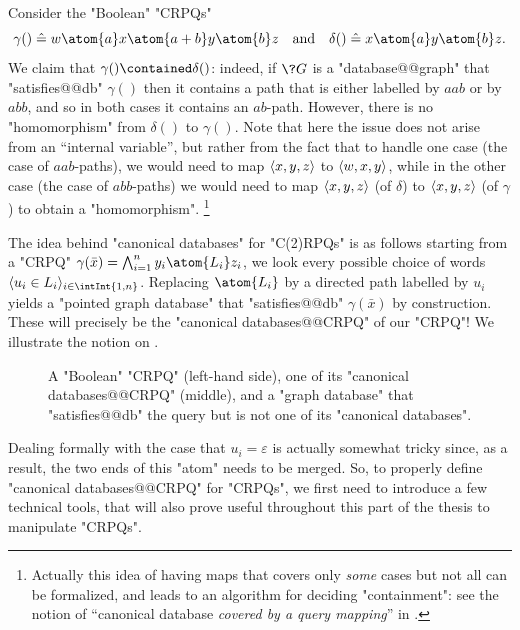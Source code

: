 \begin{example}
    \label{ex:ex-containment-non-uniform}
    Consider the "Boolean" "CRPQs"
    \[
        \gamma() \defeq w \atom{a} x \atom{a+b} y \atom{b} z
        \quad\text{and}\quad 
        \delta() \defeq x \atom{a} y \atom{b} z.
    \]
    We claim that $\gamma() \contained \delta()$: indeed, 
    if $\?G$ is a "database@@graph" that "satisfies@@db" $\gamma()$
    then it contains a path that is either labelled by
    $aab$ or by $abb$, and so in both cases it contains an $ab$-path.
    However, there is no "homomorphism" from $\delta()$ to $\gamma()$.
    Note that here the issue does not arise from an
    ``internal variable'', but rather from the fact that
    to handle one case (the case of $aab$-paths), we would need to
    map $\tup{x,y,z}$ to $\tup{w,x,y}$, while in the other case (the case of
    $abb$-paths) we would need to map $\tup{x,y,z}$ (of $\delta$)
    to $\tup{x,y,z}$ (of $\gamma$) to obtain a "homomorphism".%
    \footnote[][-10em]{Actually this idea of having maps that covers only \emph{some} cases
    but not all can be formalized, and leads to an algorithm
    for deciding "containment": see the notion of
    ``canonical database \emph{covered by a query mapping}'' in \cite{FlorescuLevySuciu1998Containment}.}
\end{example}

The idea behind "canonical databases" for "C(2)RPQs" is as follows
starting from a "CRPQ" $\gamma(\bar x) = \bigwedge_{i=1}^n y_i \atom{L_i} z_i$,
we look every possible choice of words $\tup{u_i \in L_i}_{i\in \intInt{1,n}}$.
Replacing $\atom{L_i}$ by a directed path labelled by $u_i$ yields a "pointed graph database"
that "satisfies@@db" $\gamma(\bar x)$ by construction. These will precisely be
the "canonical databases@@CRPQ" of our "CRPQ"! We illustrate the notion on
.
\begin{figure}
    \centering
    \begin{tikzpicture}
        
    \end{tikzpicture}
    \caption{\AP\label{fig:first-ex-cdb-wow-im-moved}
    A "Boolean" "CRPQ" (left-hand side), one of its "canonical databases@@CRPQ"
    (middle), and a "graph database" that "satisfies@@db" the query but is not one of its "canonical databases".
    }
\end{figure}
Dealing formally with the case that $u_i = \varepsilon$ is actually somewhat tricky
since, as a result, the two ends of this "atom" needs to be merged.
So, to properly define "canonical databases@@CRPQ" for "CRPQs",
we first need to introduce a few technical tools, that will also prove useful throughout this
part of the thesis to manipulate "CRPQs".

